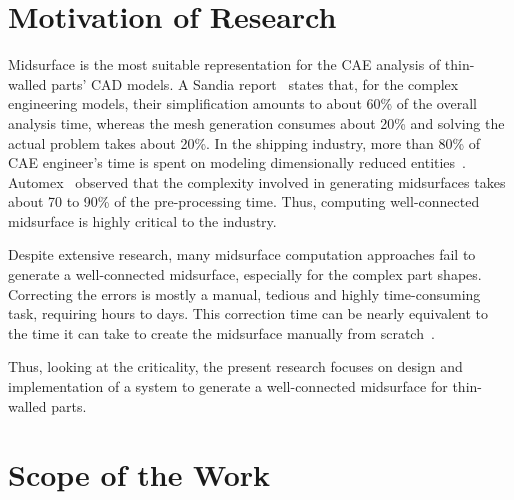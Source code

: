 \section{Motivation of Research}

 Midsurface is the most suitable representation for the CAE analysis of thin-walled parts' CAD models. 
 A Sandia report~\cite{Ming2012} states that, for the complex engineering models, their simplification amounts to about 60\% of the overall analysis time, whereas the mesh generation consumes about 20\% and solving the actual problem takes about 20\%.  In the shipping industry, more than 80\% of CAE engineer's time is spent on modeling dimensionally reduced entities~\cite{Austreng2007}. Automex~\cite{Automex} observed that the complexity involved in generating midsurfaces takes about 70 to 90\% of the pre-processing time. %
Thus,  computing well-connected midsurface is highly critical to the industry.

Despite extensive research, many midsurface computation approaches fail to generate a well-connected midsurface, especially for the complex part shapes. Correcting the errors is mostly a manual, tedious and highly time-consuming task, requiring hours to days. This correction time can be nearly equivalent to the time it can take to create the midsurface manually from scratch~\cite{Stolt2006}. 

Thus, looking at the criticality, the present research focuses on design and implementation of a system to generate a well-connected midsurface for thin-walled parts.

\section{Scope of the Work}  \label{sec:litsurvey:rscope}



